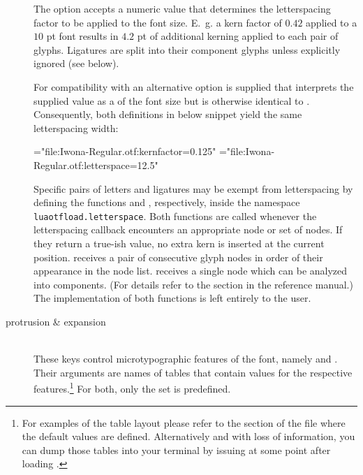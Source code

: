 \begin{description}
       The option  accepts a numeric value that
       determines the letterspacing factor to be applied to the font
       size.
       E.~g. a kern factor of $0.42$ applied to a $10$ pt font
       results in $4.2$ pt of additional kerning applied to each
       pair of glyphs.
       Ligatures are split into their component glyphs unless
       explicitly ignored (see below).

       For compatibility with \XETEX an alternative
        option is supplied that interprets the
       supplied value as a  of the font size but
       is otherwise identical to .
       Consequently, both definitions in below snippet yield the same
       letterspacing width:

			 \beginlisting
 \font\iwonakernedA="file:Iwona-Regular.otf:kernfactor=0.125"
 \font\iwonakernedB="file:Iwona-Regular.otf:letterspace=12.5"
 			 \endlisting

       Specific pairs of letters and ligatures may be exempt from
       letterspacing by defining the \LUA functions
        and ,
       respectively, inside the namespace \verb|luaotfload.letterspace|.
       Both functions are called whenever the letterspacing callback
       encounters an appropriate node or set of nodes.
       If they return a true-ish value, no extra kern is inserted at
       the current position.
        receives a pair of consecutive
       glyph nodes in order of their appearance in the node list.
        receives a single node which can be
       analyzed into components.
       (For details refer to the  section in the
       \LUATEX reference manual.)
       The implementation of both functions is left entirely to the
       user.


\item [protrusion \& expansion] \hfill \\
       These keys control microtypographic features of the font,
       namely  and .
       Their arguments are names of \LUA tables that contain
       values for the respective features.\footnote{%
          For examples of the table layout please refer to the
          section of the file  where the
          default values are defined.
          Alternatively and with loss of information, you can dump
          those tables into your terminal by issuing
					\beginlisting
					\endlisting
          at some point after loading .
       }
       For both, only the set  is predefined.


\end{description}
